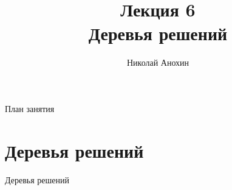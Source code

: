 \documentclass[10pt]{beamer}
\author{Николай Анохин}
\title{\newline \newline \newline Лекция 6 \\ Деревья решений}
\let\otp\titlepage
\renewcommand{\titlepage}{\otp\addtocounter{framenumber}{-1}}
\begin{document}
\begin{frame}[plain]
\titlepage
\end{frame}

\begin{frame}{План занятия}
\tableofcontents
\end{frame}

\section{Деревья решений}

\begin{frame}{}

\begin{center}
\Large Деревья решений
\end{center}

\end{frame}
\end{document}

